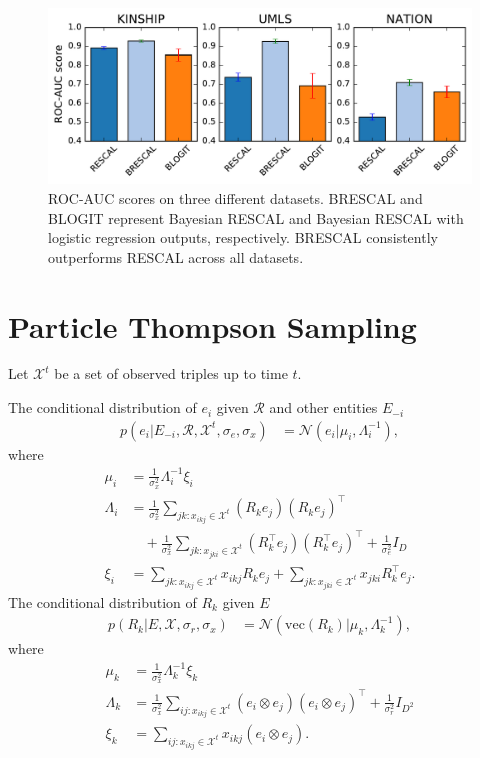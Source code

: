 \documentclass{article}
\begin{document}
\begin{figure}[t]
	\centering
	\includegraphics[width=\linewidth]{images/rescal_vs_brescal.pdf}			
	\caption{\label{fig:r_vs_br} ROC-AUC scores on three different datasets. BRESCAL and BLOGIT represent Bayesian RESCAL and Bayesian RESCAL with logistic regression outputs, respectively. BRESCAL consistently outperforms RESCAL across all datasets.}
\end{figure}



\section{Particle Thompson Sampling}
Let $\mathcal{X}^{t}$ be a set of observed triples up to time $t$.

The conditional distribution of $e_i$ given $\mathcal{R}$ and other entities $E_{-i}$
\begin{align} \label{eqn:sample_e}
p(e_i |E_{-i}, \mathcal{R}, \mathcal{X}^{t}, \sigma_e, \sigma_x) &= \mathcal{N}(e_i | \mu_i, \Lambda_i^{-1}),
\end{align}
where
\begin{align*}
\mu_i &= \frac{1}{\sigma_x^2}\Lambda_i^{-1}\xi_i \\
\Lambda_i &= \frac{1}{\sigma_x^2} \sum_{jk : x_{ikj} \in \mathcal{X}^{t}} (R_k e_j)(R_k e_j)^\top \\
&\quad+ \frac{1}{\sigma_x^2} \sum_{jk : x_{jki} \in \mathcal{X}^{t}} (R_k^\top e_j)(R_k^\top e_j)^\top+ \frac{1}{\sigma_e^2} {I}_D \\
\xi_i &= \sum_{jk : x_{ikj} \in \mathcal{X}^{t}}  x_{ikj} R_{k} e_{j} + \sum_{jk : x_{jki} \in \mathcal{X}^{t}} x_{jki} R_{k}^\top e_{j}.
\end{align*}
The conditional distribution of $R_k$ given $E$
\begin{align}
\label{eqn:sample_r}
p(R_k|E, \mathcal{X}, \sigma_r, \sigma_x)  &= \mathcal{N}(\text{vec}(R_k) | \mu_k, \Lambda_k^{-1}),
\end{align}
where
\begin{align*}
\mu_k &= \frac{1}{\sigma_x^2}\Lambda_k^{-1}\xi_k \\
\Lambda_k &= \frac{1}{\sigma_x^2} \sum_{ij:x_{ikj} \in \mathcal{X}^{t}} (e_i \otimes e_j)(e_i \otimes e_j)^\top + \frac{1}{\sigma_r^2} {I}_{D^2} \\
\xi_k &= \sum_{ij:x_{ikj} \in \mathcal{X}^{t}} x_{ikj} (e_{i} \otimes e_{j}).
\end{align*}
\end{document}
